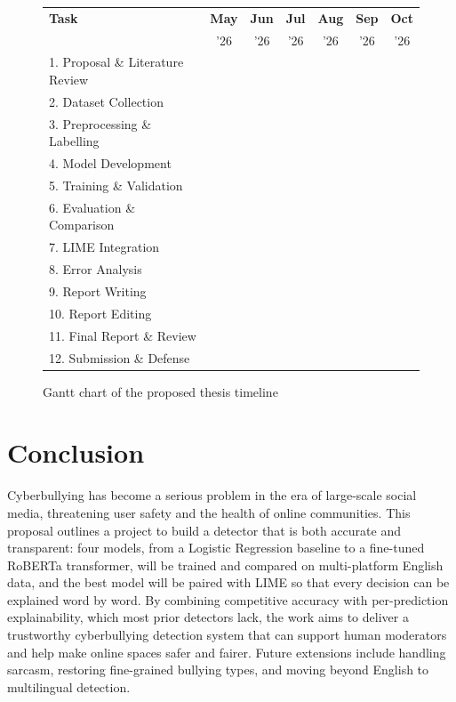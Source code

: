 \documentclass[12pt,a4paper]{article}
\newcommand{\yes}{\textcolor{okgreen}{\checkmark}}
\begin{document}
\begin{figure}[H]
\centering
\renewcommand{\arraystretch}{1.35}
\setlength{\tabcolsep}{5pt}
\small
\begin{tabular}{|p{5.2cm}|c|c|c|c|c|c|}
\hline
\textbf{Task} & \textbf{May} & \textbf{Jun} & \textbf{Jul} & \textbf{Aug} & \textbf{Sep} & \textbf{Oct} \\
 & '26 & '26 & '26 & '26 & '26 & '26 \\
\hline
1. Proposal \& Literature Review & \yes & & & & & \\ \hline
2. Dataset Collection & \yes & \yes & & & & \\ \hline
3. Preprocessing \& Labelling & & \yes & & & & \\ \hline
4. Model Development & & \yes & \yes & & & \\ \hline
5. Training \& Validation & & & \yes & \yes & & \\ \hline
6. Evaluation \& Comparison & & & & \yes & & \\ \hline
7. LIME Integration & & & & \yes & & \\ \hline
8. Error Analysis & & & & & \yes & \\ \hline
9. Report Writing & & & & & \yes & \\ \hline
10. Report Editing & & & & & \yes & \yes \\ \hline
11. Final Report \& Review & & & & & & \yes \\ \hline
12. Submission \& Defense & & & & & & \yes \\ \hline
\end{tabular}
\caption{Gantt chart of the proposed thesis timeline}
\label{fig:gantt}
\end{figure}

\section{Conclusion}
Cyberbullying has become a serious problem in the era of large-scale social media, threatening user safety and the health of online communities. This proposal outlines a project to build a detector that is both accurate and transparent: four models, from a Logistic Regression baseline to a fine-tuned RoBERTa transformer, will be trained and compared on multi-platform English data, and the best model will be paired with LIME so that every decision can be explained word by word. By combining competitive accuracy with per-prediction explainability, which most prior detectors lack, the work aims to deliver a trustworthy cyberbullying detection system that can support human moderators and help make online spaces safer and fairer. Future extensions include handling sarcasm, restoring fine-grained bullying types, and moving beyond English to multilingual detection.
\end{document}
